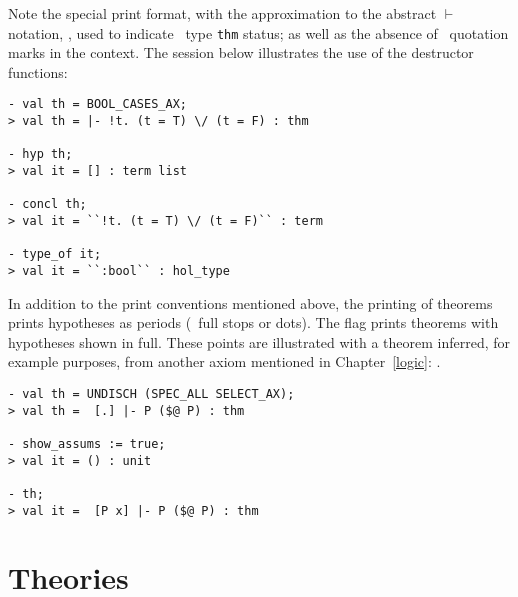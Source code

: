 \noindent Note the special print format,
 with the approximation
to the abstract $\vdash$ notation, \ml{|-}, used to indicate \ML\ type
{\small\verb+thm+} status;
as well as the absence of \HOL\ quotation marks
 in the \ml{|-} context.
The session below illustrates the use of the destructor functions:

\setcounter{sessioncount}{1}
\begin{session}
\begin{verbatim}
- val th = BOOL_CASES_AX;
> val th = |- !t. (t = T) \/ (t = F) : thm

- hyp th;
> val it = [] : term list

- concl th;
> val it = ``!t. (t = T) \/ (t = F)`` : term

- type_of it;
> val it = ``:bool`` : hol_type
\end{verbatim}
\end{session}

\noindent In addition to the print conventions mentioned above, the
printing of theorems prints hypotheses as periods
(\ie\ full stops or dots).  The flag
 prints theorems
with hypotheses shown in full. These points are illustrated with a
theorem inferred, for example purposes, from another axiom mentioned
in Chapter~\ref{logic}: .

\setcounter{sessioncount}{1}
\begin{session}
\begin{verbatim}
- val th = UNDISCH (SPEC_ALL SELECT_AX);
> val th =  [.] |- P ($@ P) : thm

- show_assums := true;
> val it = () : unit

- th;
> val it =  [P x] |- P ($@ P) : thm
\end{verbatim}
\end{session}

\section{Theories}
\label{theoryfns}

